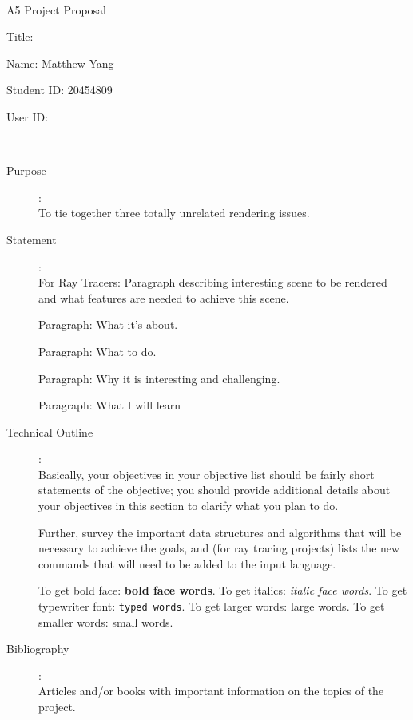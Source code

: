 \documentclass {article}
\begin{document}
~\vfill
\begin{center}
\Large

A5 Project Proposal

Title:

Name: Matthew Yang

Student ID: 20454809

User ID:
\end{center}
\vfill ~\vfill~
\newpage
{}
\begin{description}
\item[Purpose]:\\
	To tie together three totally unrelated rendering issues.

\item[Statement]:\\
	For Ray Tracers: Paragraph describing interesting scene to be
		rendered and what features are needed to achieve
		this scene.

	Paragraph: What it's about.

	Paragraph: What to do.

	Paragraph: Why it is interesting and challenging.

	Paragraph: What I will learn

\item[Technical Outline]:\\
    Basically, your objectives in your objective list should be fairly
    short statements of the objective; you should provide additional
    details about your objectives in this section to clarify what you
    plan to do.

     Further, survey the important data structures and algorithms that
     will be necessary to achieve the goals, and (for ray tracing
     projects) lists the new commands
     that will need to be added to the input language.

     To  get  bold face: {\bf bold face words}.  To get italics: {\it italic
     face words}.  To  get typewriter font: {\tt typed words}.  To get
     larger  words:  {\large large  words}.   To  get smaller words: 
     {\small small words}.  

\item[Bibliography]:\\
     Articles  and/or  books  with  important  information on the
     topics of the project.

\end{description}
\newpage


\end{document}

